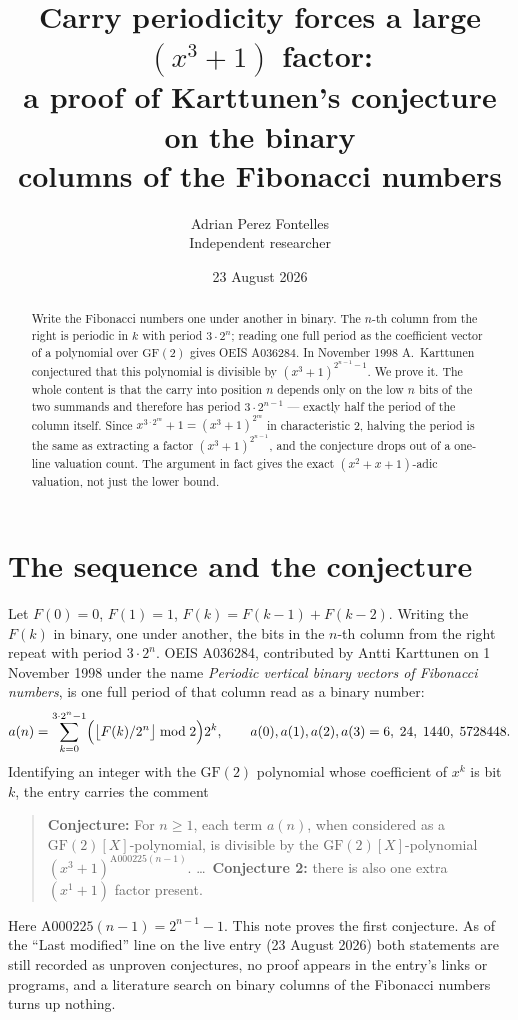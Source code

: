 \documentclass[11pt,a4paper]{article}
\title{Carry periodicity forces a large $(x^3+1)$ factor:\\
a proof of Karttunen's conjecture on the binary\\
columns of the Fibonacci numbers}
\author{Adrian Perez Fontelles\\ \small Independent researcher}
\date{23 August 2026}
\theoremstyle{plain}
\theoremstyle{definition}
\begin{document}
\maketitle

\begin{abstract}
Write the Fibonacci numbers one under another in binary. The $n$-th column from the right
is periodic in $k$ with period $3\cdot2^{n}$; reading one full period as the coefficient
vector of a polynomial over $\mathrm{GF}(2)$ gives OEIS A036284. In November 1998
A.~Karttunen conjectured that this polynomial is divisible by $(x^{3}+1)^{2^{n-1}-1}$. We
prove it. The whole content is that the carry into position $n$ depends only on the low
$n$ bits of the two summands and therefore has period $3\cdot2^{n-1}$ --- exactly half the
period of the column itself. Since $x^{3\cdot2^{m}}+1=(x^{3}+1)^{2^{m}}$ in characteristic
2, halving the period is the same as extracting a factor $(x^{3}+1)^{2^{n-1}}$, and the
conjecture drops out of a one-line valuation count. The argument in fact gives the exact
$(x^{2}+x+1)$-adic valuation, not just the lower bound.
\end{abstract}

\section{The sequence and the conjecture}

Let $F(0)=0$, $F(1)=1$, $F(k)=F(k-1)+F(k-2)$. Writing the $F(k)$ in binary, one under
another, the bits in the $n$-th column from the right repeat with period $3\cdot2^{n}$.
OEIS A036284, contributed by Antti Karttunen on 1 November 1998 under the name
\emph{Periodic vertical binary vectors of Fibonacci numbers}, is one full period of that
column read as a binary number:
\[
  a(n)=\sum_{k=0}^{3\cdot2^{n}-1}\Bigl(\bigl\lfloor F(k)/2^{n}\bigr\rfloor\bmod2\Bigr)2^{k},
  \qquad a(0),a(1),a(2),a(3)=6,\;24,\;1440,\;5728448.
\]
Identifying an integer with the $\mathrm{GF}(2)$ polynomial whose coefficient of $x^{k}$ is
bit $k$, the entry carries the comment

\begin{quote}
\textbf{Conjecture:} For $n\ge1$, each term $a(n)$, when considered as a
$\mathrm{GF}(2)[X]$-polynomial, is divisible by the $\mathrm{GF}(2)[X]$-polynomial
$(x^{3}+1)^{\mathrm{A000225}(n-1)}$. \dots\ \textbf{Conjecture 2:} there is also one extra
$(x^{1}+1)$ factor present.
\end{quote}

Here $\mathrm{A000225}(n-1)=2^{n-1}-1$. This note proves the first conjecture. As of the
``Last modified'' line on the live entry (23 August 2026) both statements are still
recorded as unproven conjectures, no proof appears in the entry's links or programs, and a
literature search on binary columns of the Fibonacci numbers turns up nothing.
\end{document}
